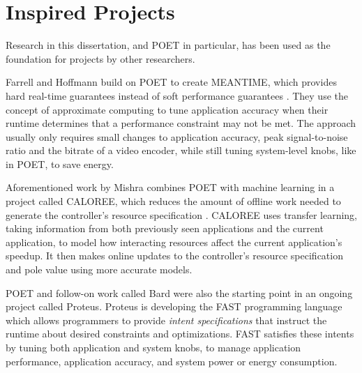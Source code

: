 \section{Inspired Projects}
\label{sec:related-inspired}

Research in this dissertation, and POET in particular, has been used as the foundation for projects by other researchers.

Farrell and Hoffmann build on POET to create MEANTIME, which provides hard real-time guarantees instead of soft performance guarantees \cite{meantime}.
They use the concept of approximate computing to tune application accuracy when their runtime determines that a performance constraint may not be met.
The approach usually only requires small changes to application accuracy, \eg peak signal-to-noise ratio and the bitrate of a video encoder, while still tuning system-level knobs, like in POET, to save energy.

Aforementioned work by Mishra \etal combines POET with machine learning in a project called CALOREE, which reduces the amount of offline work needed to generate the controller's resource specification \cite{CALOREE}.
CALOREE uses transfer learning, taking information from both previously seen applications and the current application, to model how interacting resources affect the current application's speedup.
It then makes online updates to the controller's resource specification and pole value using more accurate models.

POET and follow-on work called Bard were also the starting point in an ongoing project called Proteus.
Proteus is developing the FAST programming language which allows programmers to provide \emph{intent specifications} that instruct the runtime about desired constraints and optimizations.
FAST satisfies these intents by tuning both application and system knobs, \eg to manage application performance, application accuracy, and system power or energy consumption.

